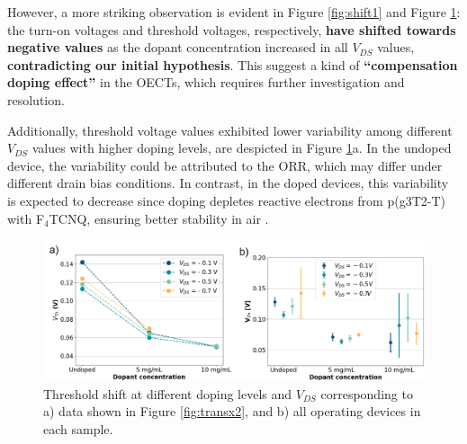 
However, a more striking observation is evident in Figure \ref{fig:shift1} and Figure \ref{fig:vth_vds}: the turn-on voltages and threshold voltages, respectively, \textbf{have shifted towards negative values} as the dopant concentration increased in all $V_{DS}$ values, \textbf{contradicting our initial hypothesis}. This suggest a kind of \textbf{``compensation doping effect''} in the OECTs, which requires further investigation and resolution. %

Additionally, threshold voltage values exhibited lower variability among different $V_{DS}$ values with higher doping levels, are despicted in Figure \ref{fig:vth_vds}a.  In the undoped device, the variability could be attributed to the ORR, which may differ under different drain bias conditions. In contrast, in the doped devices, this variability is expected to decrease since doping depletes reactive electrons from p(g3T2-T) with F$_{4}$TCNQ, ensuring better stability in air \cite{tanTuningOrganicElectrochemical2022}. %

\begin{figure}[ht]
  \centering
  \includegraphics[width=\textwidth]{Images/pdf/vth_shift_channel.pdf} 
  \caption[Threshold shift at different doping levels and $V_{DS}$]{Threshold shift at different doping levels and $V_{DS}$ corresponding to a) data shown in Figure \ref{fig:transx2}, and b) all operating devices in each sample.}
  \label{fig:vth_vds}
\end{figure}

